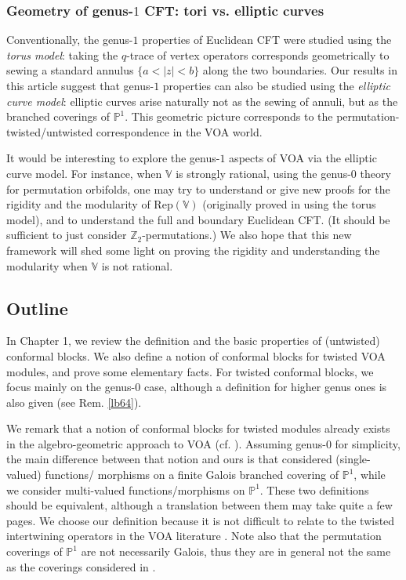 \documentclass[11pt,b5paper,notitlepage]{article}
\theoremstyle{definition}
\theoremstyle{plain}
\newcommand{\Rep}{\mathrm{Rep}}
\newcommand{\Vbb}{\mathbb V}
\newcommand{\Zbb}{\mathbb Z}
\newcommand{\Pbb}{\mathbb P}
\numberwithin{equation}{subsection}
\begin{document}
\subsubsection*{Geometry of genus-$1$  CFT: tori vs. elliptic curves}

Conventionally, the genus-$1$ properties of Euclidean  CFT were studied using the \emph{torus model}: taking the $q$-trace of vertex operators corresponds geometrically to sewing a standard annulus $\{a<|z|<b\}$ along the two boundaries. Our results in this article suggest that  genus-$1$ properties can also be studied using the \emph{elliptic curve model}: elliptic curves arise naturally not as the sewing of annuli, but as the branched coverings of $\Pbb^1$. This geometric picture corresponds to  the permutation-twisted/untwisted correspondence in the VOA world. 

It would be interesting to explore the genus-$1$ aspects of VOA via the elliptic curve model. For instance, when $\Vbb$ is strongly rational, using the genus-$0$ theory for permutation orbifolds, one may try to understand or give new proofs for the rigidity and the modularity of $\Rep(\Vbb)$ (originally proved in \cite{Hua08a,Hua08b} using the torus model), and to understand the full and boundary Euclidean CFT. (It should be sufficient to just consider $\Zbb_2$-permutations.) We also hope that this new framework will shed some light on proving the rigidity and understanding the modularity when $\Vbb$ is not rational.










\subsection{Outline}


In Chapter 1, we review the definition and the basic properties of (untwisted) conformal blocks. We also define a notion of conformal blocks for twisted VOA modules, and prove some elementary facts. For twisted conformal blocks, we focus mainly on the genus-$0$ case, although a definition for higher genus ones is also given (see Rem. \ref{lb64}).

We remark that a notion of conformal blocks for twisted modules already exists in the algebro-geometric approach to VOA  (cf. \cite{FS04}). Assuming genus-$0$ for simplicity, the main difference between that notion and ours is  that \cite{FS04} considered (single-valued) functions/ morphisms on a finite Galois branched covering of $\Pbb^1$, while we consider multi-valued functions/morphisms on $\Pbb^1$. These two definitions should be equivalent, although a translation between them may take quite a few pages. We choose our definition  because it is not difficult to relate to the twisted intertwining operators in the VOA literature \cite{Hua18,McR21}. Note also that the permutation coverings of $\Pbb^1$ are not necessarily Galois, thus they are in general not the same as the coverings considered in \cite{FS04}.
\end{document}
